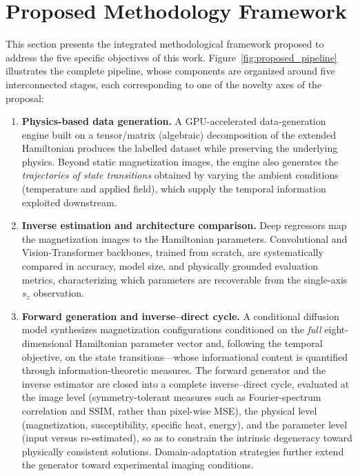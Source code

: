 \documentclass[letterpaper, 12, one column]{article}
\begin{document}
\section{Proposed Methodology Framework}\label{sec:proposed_framework}

This section presents the integrated methodological framework proposed to address the five specific objectives of this work. Figure~\ref{fig:proposed_pipeline} illustrates the complete pipeline, whose components are organized around five interconnected stages, each corresponding to one of the novelty axes of the proposal:

\begin{enumerate}
    \item \textbf{Physics-based data generation.} A GPU-accelerated data-generation engine built on a tensor/matrix (algebraic) decomposition of the extended Hamiltonian produces the labelled dataset while preserving the underlying physics. Beyond static magnetization images, the engine also generates the \emph{trajectories of state transitions} obtained by varying the ambient conditions (temperature and applied field), which supply the temporal information exploited downstream.

    \item \textbf{Inverse estimation and architecture comparison.} Deep regressors map the magnetization images to the Hamiltonian parameters. Convolutional and Vision-Transformer backbones, trained from scratch, are systematically compared in accuracy, model size, and physically grounded evaluation metrics, characterizing which parameters are recoverable from the single-axis $s_z$ observation.

    \item \textbf{Forward generation and inverse--direct cycle.} A conditional diffusion model synthesizes magnetization configurations conditioned on the \emph{full} eight-dimensional Hamiltonian parameter vector and, following the temporal objective, on the state transitions---whose informational content is quantified through information-theoretic measures. The forward generator and the inverse estimator are closed into a complete inverse--direct cycle, evaluated at the image level (symmetry-tolerant measures such as Fourier-spectrum correlation and SSIM, rather than pixel-wise MSE), the physical level (magnetization, susceptibility, specific heat, energy), and the parameter level (input versus re-estimated), so as to constrain the intrinsic degeneracy toward physically consistent solutions. Domain-adaptation strategies further extend the generator toward experimental imaging conditions.


\end{enumerate}
\end{document}
